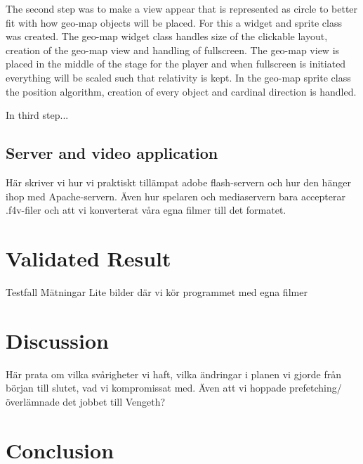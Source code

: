 \documentclass[9pt,a4paper]{acmproc}
\begin{document}
The second step was to make a view appear that is represented as circle to better fit with how geo-map objects will be placed. For this a widget and sprite class was created. The geo-map widget class handles size of the clickable layout, creation of the geo-map view and handling of fullscreen. The geo-map view is placed in the middle of the stage for the player and when fullscreen is initiated everything will be scaled such that relativity is kept. In the geo-map sprite class the position algorithm, creation of every object and cardinal direction is handled.

In third step...



\subsection{Server and video application}
Här skriver vi hur vi praktiskt tillämpat adobe flash-servern och hur den hänger ihop med Apache-servern.
Även hur spelaren och mediaservern bara accepterar .f4v-filer och att vi konverterat våra egna filmer till det formatet.


\section{Validated Result}
Testfall
Mätningar
Lite bilder där vi kör programmet med egna filmer


\section{Discussion}
Här prata om vilka svårigheter vi haft, vilka ändringar i planen vi gjorde från början till slutet, vad vi kompromissat med. Även att vi hoppade prefetching/överlämnade det jobbet till Vengeth?

\section{Conclusion}

\end{document}
